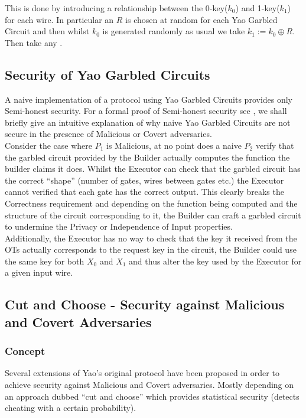 \documentclass[ %
                    author={Nicholas Tutte},
                supervisor={Prof. Nigel Smart},
                    degree={MEng},
                     title={Secure Two Party Computation},
                  subtitle={A practical comparison of recent protocols},
                      type={Research - GG1K},
                      year={2015} ]{dissertation}
\begin{document}
				This is done by introducing a relationship between the 0-key($k_0$) and 1-key($k_1$) for each wire. In particular an $R$ is chosen at random for each Yao Garbled Circuit and then whilst $k_0$ is generated randomly as usual we take $k_1 := k_0 \oplus R$. Then take any .

		\subsection{Security of Yao Garbled Circuits} \label{sub:YaoSecurity}
			A naive implementation of a protocol using Yao Garbled Circuits provides only Semi-honest security. For a formal proof of Semi-honest security see \cite{ProofOfYaoSecurity}, we shall briefly give an intuitive explanation of why naive Yao Garbled Circuits are not secure in the presence of Malicious or Covert adversaries.\\

			Consider the case where $P_1$ is Malicious, at no point does a naive $P_2$ verify that the garbled circuit provided by the Builder actually computes the function the builder claims it does. Whilst the Executor can check that the garbled circuit has the correct ``shape'' (number of gates, wires between gates etc.) the Executor cannot verified that each gate has the correct output. {This clearly breaks the Correctness requirement and depending on the function being computed and the structure of the circuit corresponding to it, the Builder can craft a garbled circuit to undermine the Privacy or Independence of Input properties.}\\

			{Additionally, the Executor has no way to check that the key it received from the OTs actually corresponds to the request key in the circuit, the Builder could use the same key for both $X_0$ and $X_1$ and thus alter the key used by the Executor for a given input wire.}


		\subsection{Cut and Choose - Security against Malicious and Covert Adversaries} \label{sub:YaoMalicious}
			\subsubsection{Concept}
				Several extensions of Yao's original protocol have been proposed in order to achieve security against Malicious and Covert adversaries. Mostly depending on an approach dubbed ``cut and choose'' which provides statistical security (detects cheating with a certain probability).\\
\end{document}
